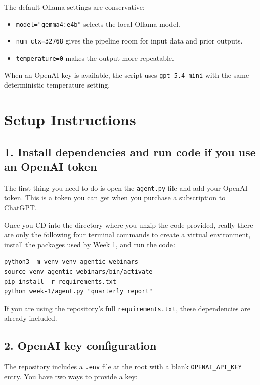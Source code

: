 \documentclass[12pt, a4paper]{article}
\begin{document}
The default Ollama settings are conservative:

\begin{itemize}[leftmargin=1.5em]
  \item \texttt{model="gemma4:e4b"} selects the local Ollama model.
  \item \texttt{num\_ctx=32768} gives the pipeline room for input data and prior outputs.
  \item \texttt{temperature=0} makes the output more repeatable.
\end{itemize}

When an OpenAI key is available, the script uses \texttt{gpt-5.4-mini} with the same deterministic temperature setting.

\clearpage

\section{Setup Instructions}

\subsection{1. Install dependencies and run code if you use an OpenAI token}

The first thing you need to do is open the \texttt{agent.py} file and add your OpenAI token. This is a token you can get when you purchase a subscription to ChatGPT.

Once you CD into the directory where you unzip the code provided, really there are only the following four terminal commands to create a virtual environment, install the packages used by Week 1, and run the code:

\begin{lstlisting}[style=shellstyle]
python3 -m venv venv-agentic-webinars
source venv-agentic-webinars/bin/activate
pip install -r requirements.txt
python week-1/agent.py "quarterly report"
\end{lstlisting}

If you are using the repository's full \texttt{requirements.txt}, these dependencies are already included.

\subsection{2. OpenAI key configuration}
The repository includes a \texttt{.env} file at the root with a blank \texttt{OPENAI\_API\_KEY} entry. You have two ways to provide a key:
\end{document}
